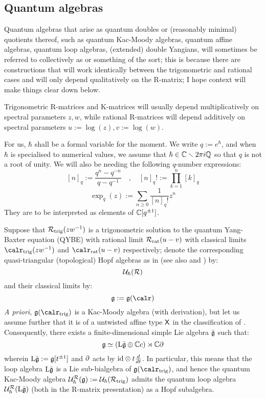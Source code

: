         \subsection{Quantum algebras}
            Quantum algebras that arise as quantum doubles or (reasonably minimal) quotients thereof, such as quantum Kac-Moody algebras, quantum affine algebras, quantum loop algebras, (extended) double Yangians, will sometimes be referred to collectively as  or something of the sort; this is because there are constructions that will work identically between the trigonometric and rational cases and will only depend qualitatively on the R-matrix; I hope context will make things clear down below.

            Trigonometric R-matrices and K-matrices will usually depend multiplicatively on spectral parameters $z, w$, while rational R-matrices will depend additively on spectral parameters $u := \log(z), v := \log(w)$.
        
            For us, $\hbar$ shall be a formal variable for the moment. We write $q := e^{\hbar}$, and when $\hbar$ is specialised to numerical values, we assume that $\hbar \in \mathbb{C} \smallsetminus 2\pi i \mathbb{Q}$ so that $q$ is not a root of unity. We will also be needing the following $q$-number expressions:
                $$[n]_q := \frac{q^n - q^{-n}}{q - q^{-1}} \quad, \quad [n]_q! := \prod_{k = 1}^n [k]_q$$
                $$\exp_q(z) := \sum_{n \geq 0} \frac{1}{[n]_q!} z^n$$
            They are to be interpreted as elements of $\mathbb{C}[q^{\pm 1}]$.
        
            Suppose that $\mathcal{R}_{\mathrm{trig}}(zw^{-1})$ is a trigonometric solution to the quantum Yang-Baxter equation (QYBE) with rational limit $\mathcal{R}_{\mathrm{rat}}(u - v)$ with classical limits $\calr_{\trigonometric}(zw^{-1})$ and $\calr_{\rational}(u - v)$ respectively; denote the corresponding quasi-triangular (topological) Hopf algebras as in \cite{etingof_kazhdan_quantisation_1} (see also \cite{etingof_kazhdan_quantisation_1} and \cite{etingof_kazhdan_quantisation_6}) by:
                $$\mathcal{U}_{\hbar}(\mathcal{R})$$
            and their classical limits by:
                $$\g := \g(\calr)$$
            \textit{A priori}, $\g(\calr_{\trigonometric})$ is a Kac-Moody algebra (with derivation), but let us assume further that it is of a untwisted affine type $\mathsf{X}$ in the classification of \cite[Chapter 4]{kac_infinite_dimensional_lie_algebras}. Consequently, there exists a finite-dimensional simple Lie algebra $\bar{\mathfrak{g}}$ such that:
                $$\mathfrak{g} \simeq ( \mathrm{L} \bar{\mathfrak{g}} \oplus \mathbb{C} c ) \rtimes \mathbb{C} \partial$$
            wherein $\mathrm{L} \bar{\mathfrak{g}} := \mathfrak{g}[t^{\pm 1}]$ and $\partial$ acts by $\id \tensor t\frac{d}{dt}$. In particular, this means that the loop algebra $\mathrm{L} \bar{\mathfrak{g}}$ is a Lie sub-bialgebra of $\g(\calr_{\trigonometric})$, and hence the quantum Kac-Moody algebra $\mathcal{U}_{\hbar}^{\mathcal{R}}(\mathfrak{g}) := \mathcal{U}_{\hbar}(\mathcal{R}_{\mathrm{trig}})$ admits the quantum loop algebra $\mathcal{U}_{\hbar}^{\mathcal{R}}(\mathrm{L} \bar{\mathfrak{g}})$ (both in the R-matrix presentation) as a Hopf subalgebra.

